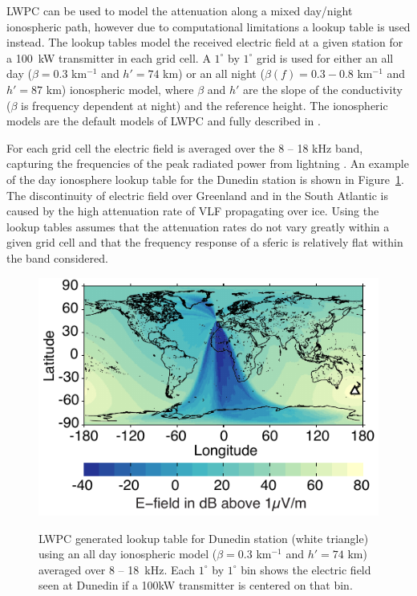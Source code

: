 LWPC can be used to model the attenuation along a mixed day/night ionospheric path, however due to computational limitations a lookup table is used instead.
The lookup tables model the received electric field at a given station for a 100~kW transmitter in each grid cell.
A $1^{\circ}$ by $1^{\circ}$ grid is used for either an all day ($\beta=0.3$ km$^{-1}$ and $h'=74$ km) or an all night ($\beta(f)=0.3-0.8$ km$^{-1}$ and $h'=87$ km) ionospheric model, where $\beta$ and $h'$ are the slope of the conductivity ($\beta$ is frequency dependent at night) and the reference height.
The ionospheric models are the default models of LWPC and fully described in \citet{Ferguson1998}.

For each grid cell the electric field is averaged over the 8 -- 18 kHz band, capturing the frequencies of the peak radiated power from lightning \citep{Volland1995}.
An example of the day ionosphere lookup table for the Dunedin station is shown in Figure~\ref{intro:fig:lookup}.
The discontinuity of electric field over Greenland and in the South Atlantic is caused by the high attenuation rate of VLF propagating over ice.
Using the lookup tables assumes that the attenuation rates do not vary greatly within a given grid cell and that the frequency response of a sferic is relatively flat within the band considered.

\begin{figure}[ht!]
	\centering
	\includegraphics[scale=1]{Energy/Figures/PPS_Lookup.pdf}\\
	\caption{LWPC generated lookup table for Dunedin station (white triangle) using an all day ionospheric model ($	\beta=0.3$ km$^{-1}$ and $h'=74$ km) averaged over 8 -- 18~kHz. Each $1^{\circ}$ by $1^{\circ}$ bin shows the electric field seen at Dunedin if a 100kW transmitter is centered on that bin.}
	\label{intro:fig:lookup}
\end{figure}

